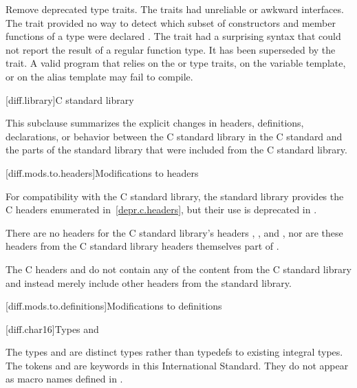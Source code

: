 \change
Remove deprecated type traits.
\rationale
The traits had unreliable or awkward interfaces. The 
trait provided no way to detect which subset of constructors and member
functions of a type were declared . The 
trait had a surprising syntax that could not report the result of a regular
function type. It has been superseded by the  trait.
\effect
A valid \CppXVII{} program that relies on the  or
 type traits, on the  variable template,
or on the  alias template may fail to compile.

[diff.library]{C standard library}
%

\pnum
This subclause summarizes the explicit changes in headers,
definitions, declarations, or behavior between the C standard library
in the C standard and the parts of the \Cpp{} standard library that were
included from the C standard library.

[diff.mods.to.headers]{Modifications to headers}

\pnum
For compatibility with the C standard library,
the \Cpp{} standard library provides the C headers enumerated
in~\ref{depr.c.headers}, but their use is deprecated in \Cpp{}.

\pnum
There are no \Cpp{} headers for the C standard library's headers
,
,
and ,
nor are these headers from the C standard library headers themselves part of \Cpp{}.

\pnum
The C headers  and
 do not contain any of the content from
the C standard library and instead merely include other headers from the \Cpp{}
standard library.

[diff.mods.to.definitions]{Modifications to definitions}

[diff.char16]{Types  and }

\pnum
The types  and 
are distinct types rather than typedefs to existing integral types.
The tokens  and 
are keywords in this International Standard.
They do not appear as macro names defined in
.

